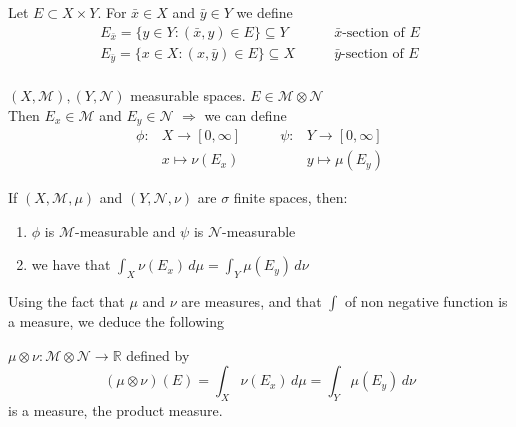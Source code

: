 \begin{definition}
    Let \(E \subset X \times Y \). For \( \bar{x} \in X \) and \(\bar{y} \in Y \) we define
\[ 
    \begin{array}{ll}
        E_{\bar{x}} = \{ y \in Y: \left( \bar{x}, y \right) \in E \} \subseteq Y & \qquad \bar{x} \text{-section of } E \\
        E_{\bar{y}} = \{ x \in X: \left( x, \bar{y} \right) \in E \} \subseteq X & \qquad \bar{y} \mbox{-section of } E \\
    \end{array}
\]
\end{definition}

\begin{proposition}
    \(\left( X, \mathcal{M} \right), \left( Y, \mathcal{N} \right)\) measurable spaces. \(E \in \mathcal{M} \otimes \mathcal{N}\) \\
    Then \(E_x \in \mathcal{M} \) and \(E_y \in \mathcal{N} \) 
    \(\Rightarrow \) we can define 
    \[
    \begin{array}{rlrl}
        \phi : & X \rightarrow \left[ 0, \infty \right] & \qquad  \psi : &Y \rightarrow \left[ 0, \infty \right] \\
                & x \mapsto \nu(E_x) & & y \mapsto \mu(E_y) 
        
    \end{array}    
    \]
\end{proposition}


\begin{theorem}
    If \(\left(X, \mathcal{M}, \mu \right)\) and \(\left(Y, \mathcal{N}, \nu \right)\) are \(\sigma\) finite spaces, then:
    \begin{enumerate}
        \item \(\phi\) is \(\mathcal{M}\)-measurable and \(\psi\) is \( \mathcal{N}\)-measurable
        \item we have that \(\int_X \nu(E_x) \, d\mu = \int_Y \mu(E_y) \, d\nu \)
    \end{enumerate}
\end{theorem}

Using the fact that \(\mu \) and \(\nu\) are measures, and that \(\int\) of non negative function is a measure, we deduce the following

\begin{theorem}
    \(\mu \otimes \nu : \mathcal{M} \otimes \mathcal{N} \rightarrow \mathbb{R} \) defined by
    \[ \left(\mu \otimes \nu \right)(E) = \int_X \nu(E_x) \, d\mu = \int_Y \mu(E_y) \, d\nu\]
    is a measure, the product measure.
\end{theorem}

